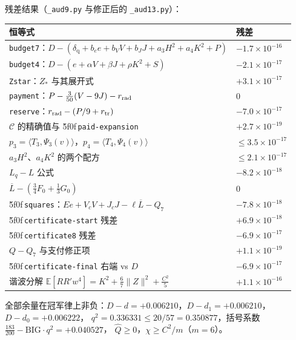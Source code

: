 \documentclass[UTF8,11pt]{ctexart}
\theoremstyle{definition}
\newcommand{\E}{\mathbb{E}}
\newcommand{\peq}[1]{\textup{\u5f0f}\,\texttt{#1}}
\begin{document}
\noindent 残差结果（\texttt{\_aud9.py} 与修正后的 \texttt{\_aud13.py}）：
\begin{center}
\small
\begin{tabular}{ll}
\toprule
恒等式 & 残差\\
\midrule
\texttt{budget7}：$D-(\delta_{\mathrm q}+b_ee+b_VV+b_JJ+a_3H^2+a_4K^2+P)$ & $-1.7\times10^{-16}$\\
\texttt{budget4}：$D-(e+\alpha V+\beta J+\rho K^2+S)$ & $-2.1\times10^{-17}$\\
\texttt{Zstar}：$Z_*$ 与其展开式 & $+3.1\times10^{-17}$\\
\texttt{payment}：$P-\frac3{50}(V-9J)-r_{\rm rad}$ & $0$\\
\texttt{reserve}：$r_{\rm rad}-(P/9+r_{\rm tr})$ & $-7.0\times10^{-17}$\\
$\mathcal C$ 的精确值与 \peq{paid-expansion} & $+2.7\times10^{-19}$\\
$p_3=\langle T_3,\Psi_3(v)\rangle$，$p_4=\langle T_4,\Psi_4(v)\rangle$ & $\le3.5\times10^{-17}$\\
$a_3H^2$、$a_4K^2$ 的两个配方 & $\le2.1\times10^{-17}$\\
$L_q-L$ 公式 & $-8.2\times10^{-18}$\\
$\overline L-(\frac34F_0+\frac13G_0)$ & $0$\\
\peq{squares}：$Ee+V_cV+J_cJ-\ell\overline L-Q_7$ & $-7.8\times10^{-18}$\\
\peq{certificate-start} 残差 & $+6.9\times10^{-18}$\\
\peq{certificate8} 残差 & $-6.9\times10^{-17}$\\
$Q-Q_7$ 与支付修正项 & $+1.1\times10^{-19}$\\
\peq{certificate-final} 右端 vs $D$ & $-6.9\times10^{-17}$\\
谐波分解 $\E[RR'w^4]=K^2+\frac67\|Z\|^2+\frac{C^2}5$ & $+1.1\times10^{-16}$\\
\bottomrule
\end{tabular}
\end{center}

\noindent 全部余量在冠军律上非负：$D-d=+0.006210$，$D-d_1=+0.006210$，$D-d_0=+0.006222$，
$q^2=0.336331\le20/57=0.350877$，括号系数 $\frac{183}{200}-\mathrm{BIG}\cdot q^2=+0.040527$，
$\widehat Q\ge0$，$\chi\ge C^2/m$（$m=6$）。
\end{document}
